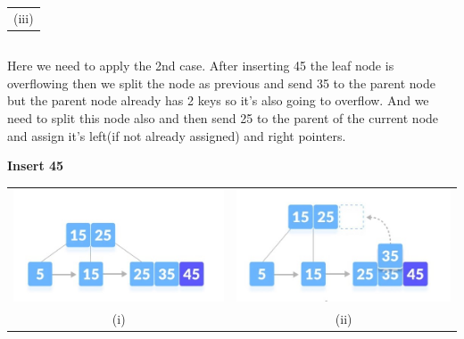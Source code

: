 \documentclass{article}
\begin{document}
\begin{table}[ht]
\begin{tabular}{c c}
                \multicolumn{2}{c}{({\color{red}iii})}\\
            \end{tabular}
        \end{table}
        \subsection*{}
        Here we need to apply the 2nd case. After inserting 45 the leaf node is overflowing then we split the node as previous and send 35 to the parent node but the parent node already has 2 keys so it's also going to overflow. And we need to split this node also and then send 25 to the parent of the current node and assign it's left(if not already assigned) and right pointers. 
        \begin{center}
            \color{red}\textbf{Insert 45}  
        \end{center}
        \begin{table}[ht]
            \centering
            \begin{tabular}{c c}
                    \includegraphics[scale=0.7]{Images/bi5_1_1.jpg} &\includegraphics[scale=0.7]{Images/bi5_1_2.jpg}\\
                ({\color{red}i}) &({\color{red}ii}) \\
            \end{tabular}
        \end{table}
\end{document}
